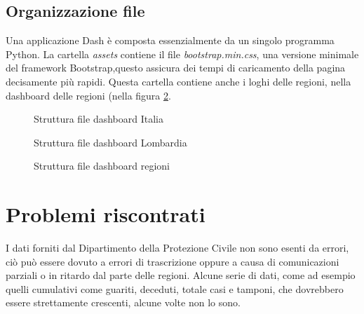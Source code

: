 \subsection{Organizzazione file}
Una applicazione Dash è composta essenzialmente da un singolo programma Python.
La cartella \emph{assets} contiene il file \emph{bootstrap.min.css}, una versione minimale del framework Bootstrap,\footnotemark questo assicura dei tempi di caricamento della pagina decisamente più rapidi.
Questa cartella contiene anche i loghi delle regioni, nella dashboard delle regioni (nella figura \ref{fig:tree_regioni}.

\begin{figure}
\centering
\begin{minipage}{.3\linewidth}
\caption{Struttura file dashboard Italia}
\label{fig:tree_italia}
\end{minipage}\hfill
\begin{minipage}{.3\linewidth}
\caption{Struttura file dashboard Lombardia}
\label{fig:tree_lombardia}
\end{minipage}
\end{figure}
\begin{figure}
\centering
\begin{minipage}{.3\linewidth}
\caption{Struttura file dashboard regioni}
\label{fig:tree_regioni}
\end{minipage}\hfill
\end{figure}

\section{Problemi riscontrati}
I dati forniti dal Dipartimento della Protezione Civile non sono esenti da errori, ciò può essere dovuto a errori di trascrizione oppure a causa di comunicazioni parziali o in ritardo dal parte delle regioni.
\noindent Alcune serie di dati, come ad esempio quelli cumulativi come guariti, deceduti, totale casi e tamponi, che dovrebbero essere strettamente crescenti, alcune volte non lo sono.

